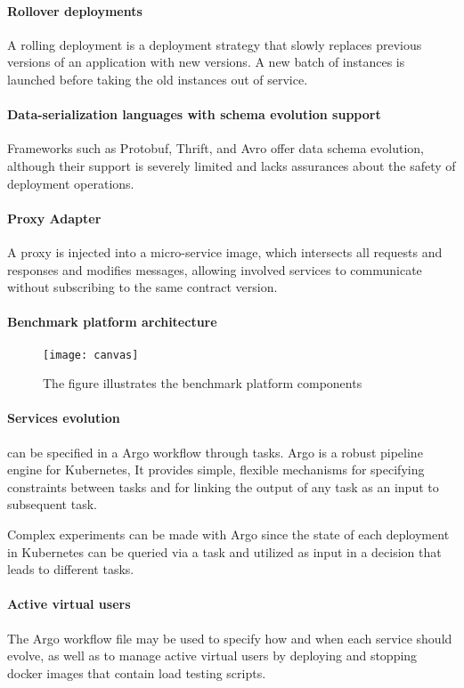 \paragraph{Rollover deployments}
A rolling deployment is a deployment strategy that slowly replaces previous versions of an application with new versions.
A new batch of instances is launched before taking the old instances out of service.

\paragraph{Data-serialization languages with schema evolution support }
Frameworks such as Protobuf, Thrift, and Avro offer data schema evolution, although their support is severely limited and lacks assurances about the safety of deployment operations.

\paragraph{Proxy Adapter}
A proxy is injected into a micro-service image, which intersects all requests and responses and modifies messages, allowing involved services to communicate without subscribing to the same contract version.

\paragraph{Benchmark platform architecture}

\begin{figure}[htbp]
    \centering
    \texttt{[image: canvas]}
    \caption{The figure illustrates the benchmark platform components}
    \label{fig:canvas}
\end{figure}

\paragraph{Services evolution} can be specified in a Argo workflow through tasks.
Argo is a robust pipeline engine for Kubernetes, It provides simple, flexible mechanisms for specifying constraints between tasks and for linking the output of any task as an input to subsequent task.

Complex experiments can be made with Argo since the state of each deployment in Kubernetes can be queried via a task and utilized as input in a decision that leads to different tasks.

\paragraph{Active virtual users} The Argo workflow file may be used to specify how and when each service should evolve, as well as to manage active virtual users by deploying and stopping docker images that contain load testing scripts.


